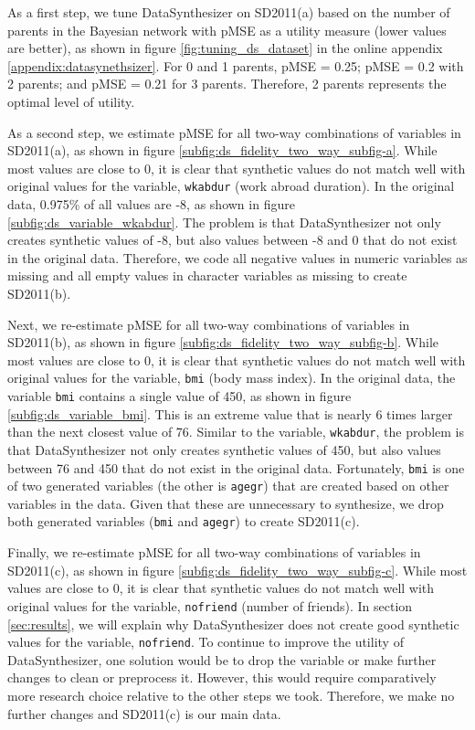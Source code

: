 \documentclass[runningheads]{llncs}
\begin{document}
As a first step, we tune DataSynthesizer on SD2011(a) based on the number of parents in the Bayesian network with pMSE as a utility measure (lower values are better), as shown in figure \ref{fig:tuning_ds_dataset} in the online appendix \ref{appendix:datasynethsizer}.  For 0 and 1 parents, pMSE = 0.25; pMSE = 0.2 with 2 parents; and pMSE = 0.21 for 3 parents.  Therefore, 2 parents represents the optimal level of utility.

As a second step, we estimate pMSE for all two-way combinations of variables in SD2011(a), as shown in figure \ref{subfig:ds_fidelity_two_way_subfig-a}.  While most values are close to 0, it is clear that synthetic values do not match well with original values for the variable, \texttt{wkabdur} (work abroad duration).  In the original data, 0.975\% of all values are -8, as shown in figure \ref{subfig:ds_variable_wkabdur}.  The problem is that DataSynthesizer not only creates synthetic values of -8, but also values between -8 and 0 that do not exist in the original data.  Therefore, we code all negative values in numeric variables as missing and all empty values in character variables as missing to create SD2011(b).

Next, we re-estimate pMSE for all two-way combinations of variables in SD2011(b), as shown in figure \ref{subfig:ds_fidelity_two_way_subfig-b}.  While most values are close to 0, it is clear that synthetic values do not match well with original values for the variable, \texttt{bmi} (body mass index).  In the original data, the variable \texttt{bmi} contains a single value of 450, as shown in figure \ref{subfig:ds_variable_bmi}.  This is an extreme value that is nearly 6 times larger than the next closest value of 76.  Similar to the variable, \texttt{wkabdur}, the problem is that DataSynthesizer not only creates synthetic values of 450, but also values between 76 and 450 that do not exist in the original data.  Fortunately, \texttt{bmi} is one of two generated variables (the other is \texttt{agegr}) that are created based on other variables in the data.  Given that these are unnecessary to synthesize, we drop both generated variables (\texttt{bmi} and \texttt{agegr}) to create SD2011(c).

Finally, we re-estimate pMSE for all two-way combinations of variables in SD2011(c), as shown in figure \ref{subfig:ds_fidelity_two_way_subfig-c}.  While most values are close to 0, it is clear that synthetic values do not match well with original values for the variable, \texttt{nofriend} (number of friends).  In section \ref{sec:results}, we will explain why DataSynthesizer does not create good synthetic values for the variable, \texttt{nofriend}.  To continue to improve the utility of DataSynthesizer, one solution would be to drop the variable or make further changes to clean or preprocess it.  However, this would require comparatively more research choice relative to the other steps we took.  Therefore, we make no further changes and SD2011(c) is our main data.
\end{document}

